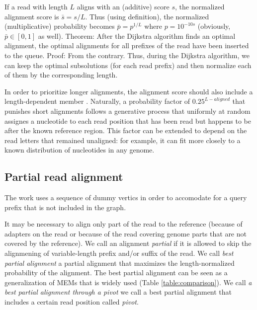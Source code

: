 If a read with length $L$ aligns with an (additive) score $s$, the normalized alignment score is $\bar{s} = s / L$.
Thus (using definition), the normalized (multiplicative) probability becomes $\bar{p} = p^{1/L}$ where $p = 10^{-10 s}$ (obviously, $\bar{p} \in [0, 1]$ as well).
Theorem: After the Dijkstra algorithm finds an optimal alignment, the optimal alignments for all prefixes of the read have been inserted to the queue. Proof: From the contrary. 
Thus, during the Dijkstra algorithm, we can keep the optimal subsolutions (for each read prefix) and then normalize each of them by the corresponding length.

In order to prioritize longer alignments, the alignment score should also include a length-dependent member .
Naturally, a probability factor of $0.25^{L-\textit{aligned}}$ that punishes short alignments follows a generative process that uniformly at random assignes a nucleotide to each read position that has been read but happens to be after the known reference region.
This factor can be extended to depend on the read letters that remained unaligned: for example, it can fit more closely to a known distribution of nucleotides in any genome. 


\subsection{Partial read alignment}
The work \cite{jain2019complexity} uses a sequence of dummy vertics in order to accomodate for a query prefix that is not included in the graph.

It may be necessary to align only part of the read to the reference
	(\eg because of adapters on the read or because of the read covering genome parts that are not covered by the reference).
We call an alignment \textit{partial} if it is allowed to skip the alignmening of variable-length prefix and/or suffix of the read.
We call \textit{best partial alignment} a partial alignment that maximizes the length-normalized probability of the alignment.
The best partial alignment can be seen as a generalization of MEMs that is widely used (Table \ref{table:comparison}).
We call \textit{a best partial alignment through a pivot} we call a best partial alignment that includes a certain read position called \textit{pivot}.

